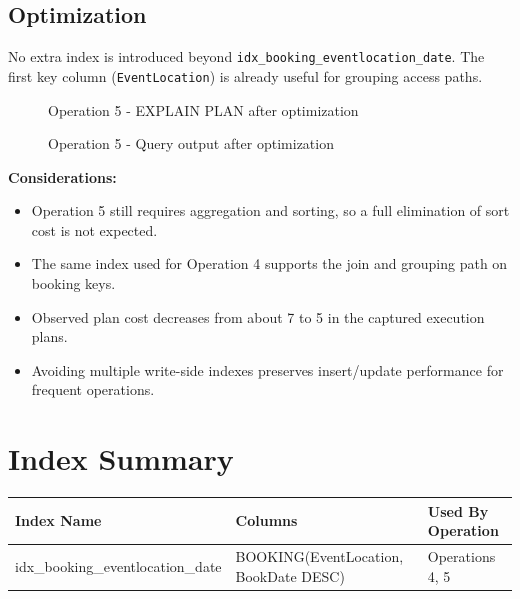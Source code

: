 \subsection{Optimization}

No extra index is introduced beyond \texttt{idx\_booking\_eventlocation\_date}. The first key column (\texttt{EventLocation}) is already useful for grouping access paths.

\begin{figure}[H]
    \centering
    \caption{Operation 5 - EXPLAIN PLAN after optimization}
\end{figure}

\begin{figure}[H]
    \centering
    \begin{subfigure}[t]{0.49\textwidth}
        \centering
    \end{subfigure}
    \hfill
    \begin{subfigure}[t]{0.49\textwidth}
        \centering
    \end{subfigure}
    \caption{Operation 5 - Query output after optimization}
\end{figure}

\textbf{Considerations:}
\begin{itemize}
    \item Operation 5 still requires aggregation and sorting, so a full elimination of sort cost is not expected.
    \item The same index used for Operation 4 supports the join and grouping path on booking keys.
    \item Observed plan cost decreases from about 7 to 5 in the captured execution plans.
    \item Avoiding multiple write-side indexes preserves insert/update performance for frequent operations.
\end{itemize}

\section{Index Summary}

\begin{center}
\begin{tabular}{|p{4cm}|p{5cm}|p{3cm}|}
\hline
\textbf{Index Name} & \textbf{Columns} & \textbf{Used By Operation} \\
\hline
idx\_booking\_eventlocation\_date & BOOKING(EventLocation, BookDate DESC) & Operations 4, 5 \\
\hline
\end{tabular}
\end{center}

